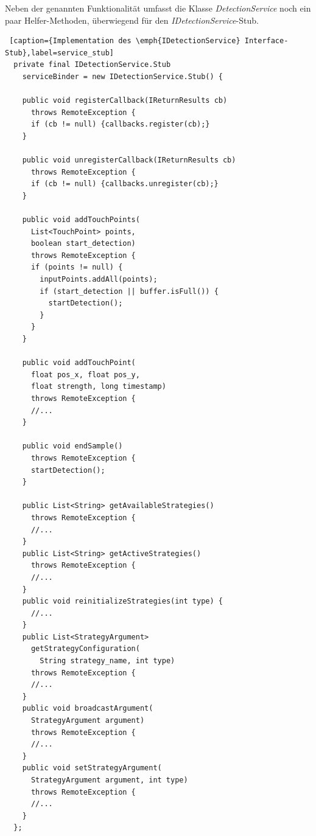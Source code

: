 Neben der genannten Funktionalität umfasst die Klasse \emph{DetectionService} noch ein paar Helfer-Methoden, überwiegend für den \emph{IDetectionService}-Stub.

\begin{lstlisting} [caption={Implementation des \emph{IDetectionService} Interface-Stub},label=service_stub]
  private final IDetectionService.Stub 
    serviceBinder = new IDetectionService.Stub() {

    public void registerCallback(IReturnResults cb) 
      throws RemoteException {
      if (cb != null) {callbacks.register(cb);}
    }

    public void unregisterCallback(IReturnResults cb) 
      throws RemoteException {
      if (cb != null) {callbacks.unregister(cb);}
    }

    public void addTouchPoints(
      List<TouchPoint> points, 
      boolean start_detection) 
      throws RemoteException {
      if (points != null) {
        inputPoints.addAll(points);
        if (start_detection || buffer.isFull()) {
          startDetection();
        }
      }
    }

    public void addTouchPoint(
      float pos_x, float pos_y, 
      float strength, long timestamp) 
      throws RemoteException {
      //...
    }

    public void endSample() 
      throws RemoteException {
      startDetection();
    }

    public List<String> getAvailableStrategies() 
      throws RemoteException {
      //...
    }
    public List<String> getActiveStrategies() 
      throws RemoteException {
      //...
    }
    public void reinitializeStrategies(int type) {
      //...
    }
    public List<StrategyArgument> 
      getStrategyConfiguration(
        String strategy_name, int type) 
      throws RemoteException {
      //...
    }
    public void broadcastArgument(
      StrategyArgument argument) 
      throws RemoteException {
      //...
    }
    public void setStrategyArgument(
      StrategyArgument argument, int type) 
      throws RemoteException {
      //...
    }
  };
\end{lstlisting}

